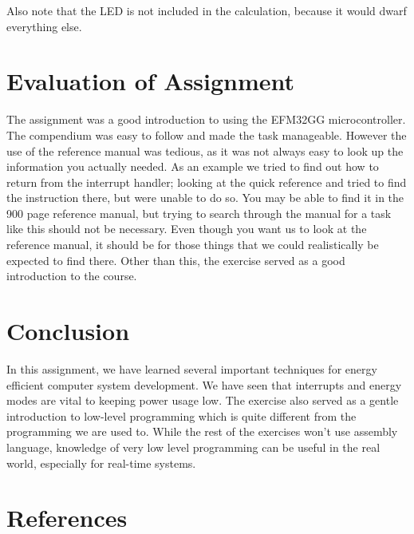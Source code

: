 \documentclass[a4paper, 12pt]{article}
\begin{document}
        Also note that the LED is not included in the calculation, because it would dwarf everything else.

\section{Evaluation of Assignment} %
\label{sec:evaluation_of_assignment}
The assignment was a good introduction to using the EFM32GG microcontroller. The compendium was easy to follow and made the task manageable. However the use of the reference manual was tedious, as it was not always easy to look up the information you actually needed. As an example we tried to find out how to return from the interrupt handler; looking at the quick reference and tried to find the instruction there, but were unable to do so. You may be able to find it in the 900 page reference manual, but trying to search through the manual for a task like this should not be necessary. Even though you want us to look at the reference manual, it should be for those things that we could realistically be expected to find there. Other than this, the exercise served as a good introduction to the course.

\section{Conclusion} %
\label{sec:conclusion}
    In this assignment, we have learned several important techniques for energy efficient computer system development. We have seen that interrupts and energy modes are vital to keeping power usage low. The exercise also served as a gentle introduction to low-level programming which is quite different from the programming we are used to. While the rest of the exercises won't use assembly language, knowledge of very low level programming can be useful in the real world, especially for real-time systems.

\section{References} %
\label{sec:references}
    
\end{document}
